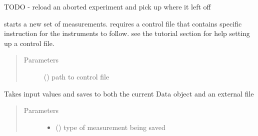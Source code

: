 \documentclass[letterpaper,10pt,english]{sphinxmanual}
\begin{document}
\begin{fulllineitems}
\begin{fulllineitems}
\end{fulllineitems}


\begin{fulllineitems}
\label{\detokenize{source/laboratory:laboratory.setup.Setup.restart_from_backup}}
TODO - reload an aborted experiment and pick up where it left off

\end{fulllineitems}


\begin{fulllineitems}
\label{\detokenize{source/laboratory:laboratory.setup.Setup.run}}
starts a new set of measurements. requires a control file that contains
specific instruction for the instruments to follow. see the tutorial section
for help setting up a control file.
\begin{quote}\begin{description}
\item[{Parameters}] \leavevmode
{} () \textendash{} path to control file

\end{description}\end{quote}

\end{fulllineitems}


\begin{fulllineitems}
\label{\detokenize{source/laboratory:laboratory.setup.Setup.save_data}}
Takes input values and saves to both the current Data object and an external file
\begin{quote}\begin{description}
\item[{Parameters}] \leavevmode\begin{itemize}
\item {} 
 () \textendash{} type of measurement being saved


\end{itemize}
\end{description}
\end{quote}
\end{fulllineitems}
\end{fulllineitems}
\end{document}
